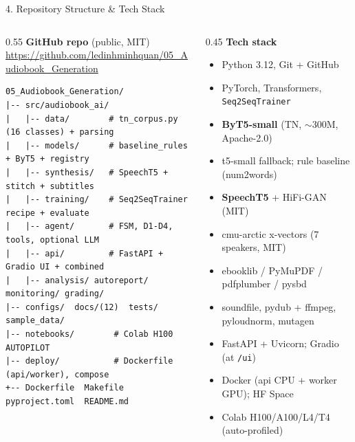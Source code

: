 \documentclass[10pt,aspectratio=169]{beamer}
\begin{document}
\begin{frame}[fragile]{4. Repository Structure \& Tech Stack}
\begin{columns}[T]
\begin{column}{0.55\textwidth}
\textbf{GitHub repo} (public, MIT) \\
\scriptsize \url{https://github.com/ledinhminhquan/05_Audiobook_Generation}

\vspace{0.15cm}
\begin{lstlisting}[basicstyle=\ttfamily\tiny]
05_Audiobook_Generation/
|-- src/audiobook_ai/
|   |-- data/        # tn_corpus.py (16 classes) + parsing
|   |-- models/      # baseline_rules + ByT5 + registry
|   |-- synthesis/   # SpeechT5 + stitch + subtitles
|   |-- training/    # Seq2SeqTrainer recipe + evaluate
|   |-- agent/       # FSM, D1-D4, tools, optional LLM
|   |-- api/         # FastAPI + Gradio UI + combined
|   |-- analysis/ autoreport/ monitoring/ grading/
|-- configs/  docs/(12)  tests/  sample_data/
|-- notebooks/        # Colab H100 AUTOPILOT
|-- deploy/           # Dockerfile (api/worker), compose
+-- Dockerfile  Makefile  pyproject.toml  README.md
\end{lstlisting}
\end{column}
\begin{column}{0.45\textwidth}
\textbf{Tech stack}
\begin{itemize}\small
  \item Python 3.12, Git + GitHub
  \item PyTorch, Transformers, \texttt{Seq2SeqTrainer}
  \item \textbf{ByT5-small} (TN, $\sim$300M, Apache-2.0)
  \item t5-small fallback; rule baseline (num2words)
  \item \textbf{SpeechT5} + HiFi-GAN (MIT)
  \item cmu-arctic x-vectors (7 speakers, MIT)
  \item ebooklib / PyMuPDF / pdfplumber / pysbd
  \item soundfile, pydub + ffmpeg, pyloudnorm, mutagen
  \item FastAPI + Uvicorn; Gradio (at \texttt{/ui})
  \item Docker (api CPU + worker GPU); HF Space
  \item Colab H100/A100/L4/T4 (auto-profiled)
\end{itemize}
\end{column}
\end{columns}
\end{frame}
\end{document}
